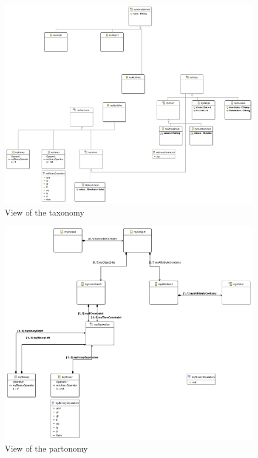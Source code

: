 \documentclass[paper=a4, fontsize=11pt]{scrartcl} %
\numberwithin{equation}{section} %
\numberwithin{figure}{section} %
\numberwithin{table}{section} %
\begin{document}
\begin{figure}[H]
\centering
\includegraphics[scale=0.65]{pictures/taxView.png}
\caption{View of the taxonomy}
\end{figure}

\begin{figure}[H]
\centering
\includegraphics[scale=0.73]{pictures/partView.png}
\caption{View of the partonomy}
\end{figure}


\end{document}
